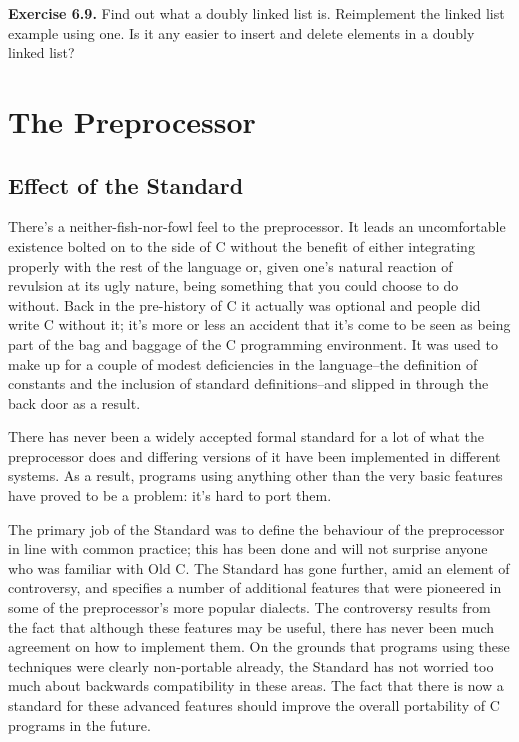   \textbf{Exercise 6.9.} Find out what a doubly linked list is. Reimplement the
   linked list example using one. Is it any easier to insert and delete
   elements in a doubly linked list?


 \chapter{The Preprocessor}


        \section{Effect of the Standard}
        

  

  There's a neither-fish-nor-fowl feel to the preprocessor. It leads an
   uncomfortable existence bolted on to the side of C without the benefit of
   either integrating properly with the rest of the language or, given one's
   natural reaction of revulsion at its ugly nature, being something that
   you could choose to do without. Back in the pre-history of C it actually
   was optional and people did write C without it; it's more or less an
   accident that it's come to be seen as being part of the bag and baggage
   of the C programming environment. It was used to make up for a couple of
   modest deficiencies in the language--the definition of constants and
   the inclusion of standard definitions--and slipped in through the
   back door as a result.


  There has never been a widely accepted formal standard for a lot of
   what the preprocessor does and differing versions of it have been
   implemented in different systems. As a result, programs using anything
   other than the very basic features have proved to be a problem: it's hard
   to port them.


  The primary job of the Standard was to define the behaviour of the
   preprocessor in line with common practice; this has been done and will
   not surprise anyone who was familiar with Old C. The Standard has gone
   further, amid an element of controversy, and specifies a number of
   additional features that were pioneered in some of the preprocessor's
   more popular dialects. The controversy results from the fact that
   although these features may be useful, there has never been much
   agreement on how to implement them. On the grounds that programs using
   these techniques were clearly non-portable already, the Standard has not
   worried too much about backwards compatibility in these areas. The fact
   that there is now a standard for these advanced features should improve
   the overall portability of C programs in the future.


